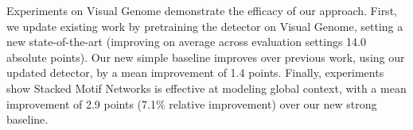 \documentclass[10pt,twocolumn,letterpaper]{article}
\newcommand{\rowan}[1]{{\color{red}rz:[#1]}}
\newcommand{\model}{\textsc{MotifNet}}
\newcommand{\modellong}{Stacked Motif Network}
\begin{document}
Experiments on Visual Genome demonstrate the efficacy of our approach. First, we update existing work by pretraining the detector on Visual Genome, setting a new state-of-the-art (improving on average across evaluation settings 14.0 absolute points).
Our new simple baseline improves over previous work, using our updated detector, by a mean improvement of 1.4 points.
Finally, experiments show {\modellong}s is effective at modeling global context, with a mean improvement of 2.9 points (7.1\% relative improvement) over our new strong baseline. %
\end{document}
